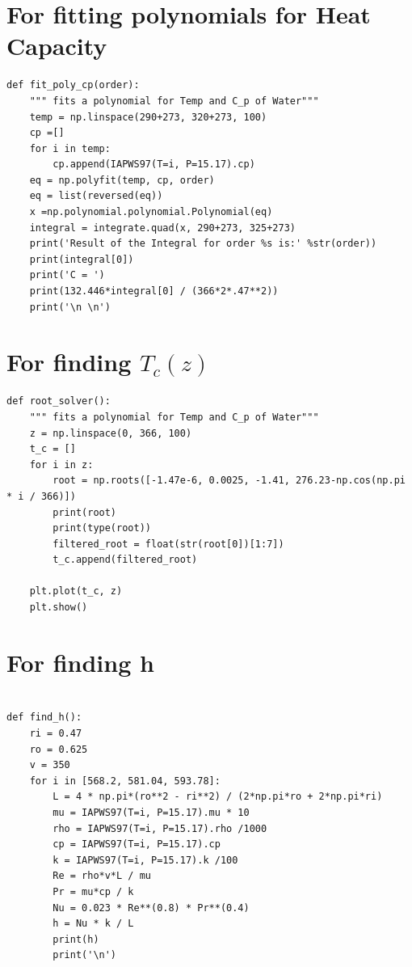 \documentclass[12pt,letterpaper]{article}
\begin{document}


\pagebreak


\begin{appendices}

\section{For fitting polynomials for Heat Capacity}

\begin{verbatim}
def fit_poly_cp(order):
    """ fits a polynomial for Temp and C_p of Water"""
    temp = np.linspace(290+273, 320+273, 100)
    cp =[]
    for i in temp:
        cp.append(IAPWS97(T=i, P=15.17).cp)
    eq = np.polyfit(temp, cp, order)
    eq = list(reversed(eq))
    x =np.polynomial.polynomial.Polynomial(eq)
    integral = integrate.quad(x, 290+273, 325+273)
    print('Result of the Integral for order %s is:' %str(order))
    print(integral[0])
    print('C = ')
    print(132.446*integral[0] / (366*2*.47**2))
    print('\n \n')
\end{verbatim}

\section{For finding $T_c(z)$}

\begin{verbatim}
def root_solver():
    """ fits a polynomial for Temp and C_p of Water"""
    z = np.linspace(0, 366, 100)
    t_c = []
    for i in z:
        root = np.roots([-1.47e-6, 0.0025, -1.41, 276.23-np.cos(np.pi * i / 366)])
        print(root)
        print(type(root))
        filtered_root = float(str(root[0])[1:7])
        t_c.append(filtered_root)

    plt.plot(t_c, z)
    plt.show()
\end{verbatim}

\section{For finding h}

\begin{verbatim}

def find_h():
    ri = 0.47
    ro = 0.625
    v = 350
    for i in [568.2, 581.04, 593.78]:
        L = 4 * np.pi*(ro**2 - ri**2) / (2*np.pi*ro + 2*np.pi*ri)
        mu = IAPWS97(T=i, P=15.17).mu * 10
        rho = IAPWS97(T=i, P=15.17).rho /1000
        cp = IAPWS97(T=i, P=15.17).cp
        k = IAPWS97(T=i, P=15.17).k /100
        Re = rho*v*L / mu
        Pr = mu*cp / k
        Nu = 0.023 * Re**(0.8) * Pr**(0.4)
        h = Nu * k / L
        print(h)
        print('\n')
\end{verbatim}



\end{appendices}
\end{document}
